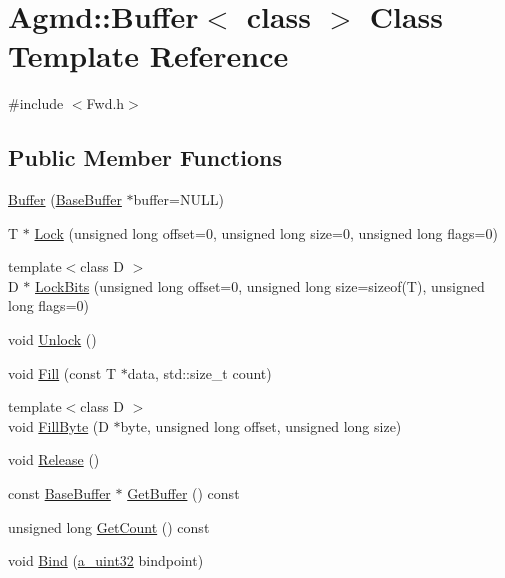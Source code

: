 \hypertarget{class_agmd_1_1_buffer}{\section{Agmd\+:\+:Buffer$<$ class $>$ Class Template Reference}
\label{class_agmd_1_1_buffer}
}


{\ttfamily \#include $<$Fwd.\+h$>$}

\subsection*{Public Member Functions}
\begin{DoxyCompactItemize}
\item 
\hyperlink{class_agmd_1_1_buffer_a39e1e132f9142cc836b6947152f1f5f3}{Buffer} (\hyperlink{class_agmd_1_1_base_buffer}{Base\+Buffer} $\ast$buffer=N\+U\+L\+L)
\item 
T $\ast$ \hyperlink{class_agmd_1_1_buffer_a4b5f60a658e941014c92a95b8d5e8333}{Lock} (unsigned long offset=0, unsigned long size=0, unsigned long flags=0)
\item 
{\footnotesize template$<$class D $>$ }\\D $\ast$ \hyperlink{class_agmd_1_1_buffer_a5b6636595c68f062e70838786d113854}{Lock\+Bits} (unsigned long offset=0, unsigned long size=sizeof(T), unsigned long flags=0)
\item 
void \hyperlink{class_agmd_1_1_buffer_a9b3ffb9531c93c44d1be382f7122d99d}{Unlock} ()
\item 
void \hyperlink{class_agmd_1_1_buffer_a103aef545e79451c983da3ac0fd80ca7}{Fill} (const T $\ast$data, std\+::size\+\_\+t count)
\item 
{\footnotesize template$<$class D $>$ }\\void \hyperlink{class_agmd_1_1_buffer_aac5fd655070b1f2a8d943537cee9b0d1}{Fill\+Byte} (D $\ast$byte, unsigned long offset, unsigned long size)
\item 
void \hyperlink{class_agmd_1_1_buffer_aaeb3b3f04ba947f13ca177c33605a384}{Release} ()
\item 
const \hyperlink{class_agmd_1_1_base_buffer}{Base\+Buffer} $\ast$ \hyperlink{class_agmd_1_1_buffer_aae4d8f499ebc30706e5ec8d419933806}{Get\+Buffer} () const 
\item 
unsigned long \hyperlink{class_agmd_1_1_buffer_aab7650c321616dc6a30cf7469b642222}{Get\+Count} () const 
\item 
void \hyperlink{class_agmd_1_1_buffer_a369a207b7040341604d4d562d0b92654}{Bind} (\hyperlink{_common_defines_8h_a964296f9770051b9e4807b1f180dd416}{a\+\_\+uint32} bindpoint)

\end{DoxyCompactItemize}
